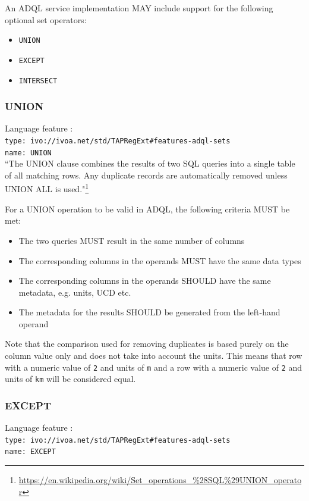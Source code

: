 \documentclass[11pt,a4paper]{ivoa}
\begin{document}
An ADQL service implementation MAY include support for the following optional
set operators:

\begin{itemize}
    \item \verb:UNION:
    \item \verb:EXCEPT:
    \item \verb:INTERSECT:
\end{itemize}

\subsubsection{UNION}
{\footnotesize Language feature :}\\
{\footnotesize \verb|type: ivo://ivoa.net/std/TAPRegExt#features-adql-sets|}\\
{\footnotesize \verb|name: UNION|}\\

``The UNION clause combines the results of two SQL queries into a single
table of all matching rows. Any duplicate records are automatically removed
unless UNION ALL is used."\footnote{\url{https://en.wikipedia.org/wiki/Set\_operations\_\%28SQL\%29UNION\_operator}}

For a UNION operation to be valid in ADQL, the following criteria MUST be met:

\begin{itemize}
    \item The two queries MUST result in the same number of columns
    \item The corresponding columns in the operands MUST have the same data types
    \item The corresponding columns in the operands SHOULD have the same metadata, e.g. units, UCD etc.
    \item The metadata for the results SHOULD be generated from the left-hand operand
\end{itemize}

Note that the comparison used for removing duplicates is based purely on the
column value only and does not take into account the units.
This means that row with a numeric value of \verb:2: and units of \verb:m:
and a row with a numeric value of \verb:2: and units of \verb:km: will be
considered equal.

\subsubsection{EXCEPT}
{\footnotesize Language feature :}\\
{\footnotesize \verb|type: ivo://ivoa.net/std/TAPRegExt#features-adql-sets|}\\
{\footnotesize \verb|name: EXCEPT|}\\
\end{document}
